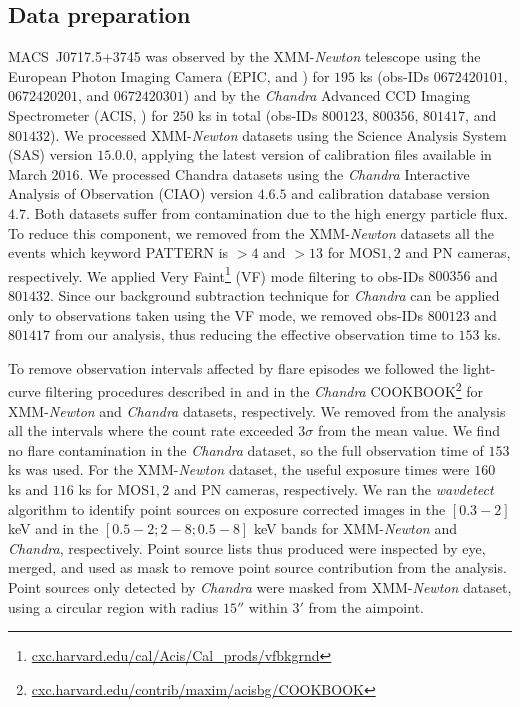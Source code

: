 \documentclass[twocolumn,traditabstract]{aa}
\begin{document}
\subsection{Data preparation}
\mbox{MACS~J0717.5+3745} was observed by the XMM-\textit{Newton} telescope using the European Photon Imaging Camera (EPIC, \citealt{turner2001} and \citealt{struder2001}) for $195$ ks  (obs-IDs $0672420101$, $0672420201$, and $0672420301$) and by the \textit{Chandra} Advanced CCD Imaging Spectrometer (ACIS, \citealt{garmire2003}) for $250$ ks in total (obs-IDs $800123$, $800356$, $801417$, and $801432$). We processed XMM-\textit{Newton} datasets using the Science Analysis System (SAS) version $15.0.0$, applying the latest version of calibration files available in March $2016$. We processed Chandra datasets using the \textit{Chandra} Interactive Analysis of Observation (CIAO) version $4.6.5$ and calibration database version $4.7$. Both datasets suffer from contamination due to the high energy particle flux. To reduce this component, we removed from the XMM-\textit{Newton} datasets all the events which keyword PATTERN is $>4$ and $>13$ for MOS$1,2$ and PN cameras, respectively. We applied Very Faint\footnote{\url{cxc.harvard.edu/cal/Acis/Cal\_prods/vfbkgrnd}} (VF) mode filtering to obs-IDs $800356$ and $801432$. Since our background subtraction technique for \textit{Chandra} can be applied only to observations taken using the VF mode, we removed obs-IDs $800123$ and $801417$ from our analysis, thus reducing the effective observation time to $153$ ks.
 
To remove observation intervals affected by flare episodes we followed the light-curve filtering procedures described in \cite{pratt2007} and in the \textit{Chandra} COOKBOOK\footnote{\url{cxc.harvard.edu/contrib/maxim/acisbg/COOKBOOK}} for XMM-\textit{Newton} and \textit{Chandra} datasets, respectively. We removed from the analysis all the intervals where the count rate exceeded $3\sigma$ from the mean value. We find no flare contamination in the \textit{Chandra} dataset, so the full observation time of $153$ ks was used. For the XMM-\textit{Newton} dataset, the useful exposure times were $160$ ks and $116$ ks for MOS$1,2$ and PN cameras, respectively. We ran the \textit{wavdetect} algorithm \citep{freeman2002} to identify point sources on exposure corrected images in the $[0.3-2]$ keV and in the $[0.5-2 ; 2-8 ; 0.5-8]$ keV bands for XMM-\textit{Newton} and \textit{Chandra}, respectively. Point source lists thus produced were inspected by eye, merged, and used as mask to remove point source contribution from the analysis. Point sources only detected by \textit{Chandra} were masked from XMM-\textit{Newton} dataset, using a circular region with radius $15''$ within $3'$ from the aimpoint.
\end{document}
